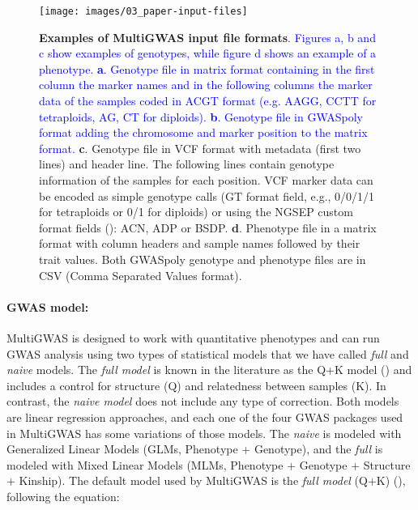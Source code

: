 \documentclass{article}
\begin{document}
\begin{figure}[H]
\begin{centering}
\texttt{[image: images/03\_paper-input-files]} 
\par\end{centering}
\caption{\textbf{\scriptsize{}Examples of MultiGWAS input file formats}{\scriptsize{}. }\textcolor{blue}{\scriptsize{}Figures a, b and c show examples of genotypes, while figure d shows an example of a phenotype. }\textbf{\textcolor{blue}{\scriptsize{}a}}\textcolor{blue}{\scriptsize{}. Genotype file in matrix format containing in the first column the marker names and in the following columns the marker data of the samples coded in \textquotedbl{}ACGT\textquotedbl{} format (e.g. AAGG, CCTT for tetraploids, AG, CT for diploids). }\textbf{\textcolor{blue}{\scriptsize{}b}}\textcolor{blue}{\scriptsize{}. Genotype file in GWASpoly format adding the chromosome and marker position to the matrix format.}{\scriptsize{} }\textbf{\scriptsize{}c}{\scriptsize{}. Genotype file in VCF format with metadata (first two lines) and header line. The following lines contain genotype information of the samples for each position. VCF marker data can be encoded as simple genotype calls (GT format field, e.g., 0/0/1/1 for tetraploids or 0/1 for diploids) or using the NGSEP custom format fields (\cite{Duitama2019}): ACN, ADP or BSDP. }\textbf{\scriptsize{}d}{\scriptsize{}. Phenotype file in a matrix format with column headers and sample names followed by their trait values. Both GWASpoly genotype and phenotype files are in CSV (Comma Separated Values format).}}
\label{fig:File-Formats}\protect 
\end{figure}





\paragraph{GWAS model:}

MultiGWAS is designed to work with quantitative phenotypes and can run GWAS analysis using two types of statistical models that we have called \emph{full} and \emph{naive} models. The \emph{full model} is known in the literature as the Q+K model (\cite{Yu2006}) and includes a control for structure (Q) and relatedness between samples (K). In contrast, the \emph{naive model} does not include any type of correction. Both models are linear regression approaches, and each one of the four GWAS packages used in MultiGWAS has some variations of those models. The \emph{naive} is modeled with Generalized Linear Models (GLMs, Phenotype + Genotype), and the \emph{full} is modeled with Mixed Linear Models (MLMs, Phenotype + Genotype + Structure + Kinship). The default model used by MultiGWAS is the \emph{full model} (Q+K) (\cite{Yu2006}), following the equation:
\end{document}

